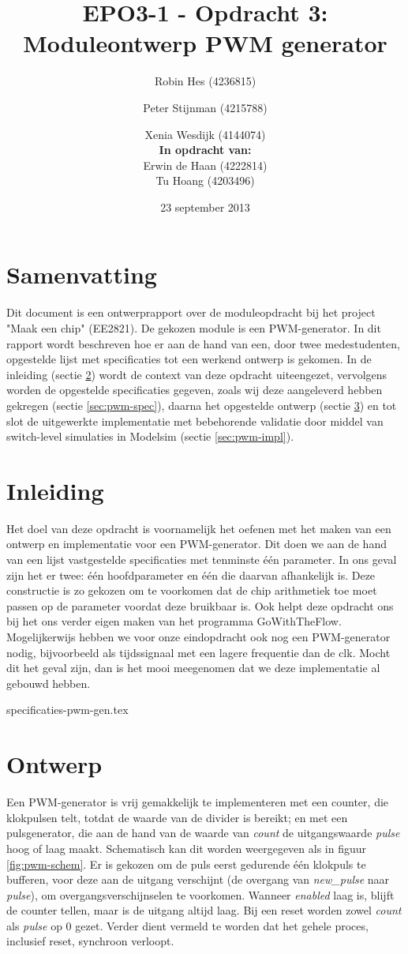 \documentclass{article}
\author{
Robin Hes (4236815) \and Peter Stijnman (4215788) \and Xenia Wesdijk (4144074) \\

\textbf{In opdracht van:} \\
Erwin de Haan (4222814) \\
Tu Hoang (4203496) \\
}
\title{EPO3-1 - Opdracht 3: Moduleontwerp PWM generator}
\date{23 september 2013}
\begin{document}
\maketitle
\section{Samenvatting}
Dit document is een ontwerprapport over de moduleopdracht bij het project "Maak een chip" (EE2821). De gekozen module is een PWM-generator.
In dit rapport wordt beschreven hoe er aan de hand van een, door twee medestudenten, opgestelde lijst met specificaties tot een werkend ontwerp is gekomen.
In de inleiding (sectie \ref{sec:pwm-inl}) wordt de context van deze opdracht uiteengezet, vervolgens worden de opgestelde specificaties gegeven, zoals wij deze aangeleverd hebben gekregen (sectie \ref{sec:pwm-spec}), daarna het opgestelde ontwerp (sectie \ref{sec:pwm-ontw}) en tot slot de uitgewerkte implementatie met bebehorende validatie door middel van switch-level simulaties in Modelsim (sectie \ref{sec:pwm-impl}).

\tableofcontents

\section{Inleiding}
\label{sec:pwm-inl}
Het doel van deze opdracht is voornamelijk het oefenen met het maken van een ontwerp en implementatie voor een PWM-generator. Dit doen we aan de hand van een lijst vastgestelde specificaties met tenminste één parameter. In ons geval zijn het er twee: één hoofdparameter en één die daarvan afhankelijk is. Deze constructie is zo gekozen om te voorkomen dat de chip arithmetiek toe moet passen op de parameter voordat deze bruikbaar is. Ook helpt deze opdracht ons bij het ons verder eigen maken van het programma GoWithTheFlow.
Mogelijkerwijs hebben we voor onze eindopdracht ook nog een PWM-generator nodig, bijvoorbeeld als tijdssignaal met een lagere frequentie dan de clk. Mocht dit het geval zijn, dan is het mooi meegenomen dat we deze implementatie al gebouwd hebben.

{specificaties-pwm-gen.tex}

\section{Ontwerp}
\label{sec:pwm-ontw}
Een PWM-generator is vrij gemakkelijk te implementeren met een counter, die klokpulsen telt, totdat de waarde van de divider is bereikt; en met een pulsgenerator, die aan de hand van de waarde van \textit{count} de uitgangswaarde \textit{pulse} hoog of laag maakt.
Schematisch kan dit worden weergegeven als in figuur \ref{fig:pwm-schem}. Er is gekozen om de puls eerst gedurende één klokpuls te bufferen, voor deze aan de uitgang verschijnt (de overgang van \textit{new\_pulse} naar \textit{pulse}), om overgangsverschijnselen te voorkomen. Wanneer \textit{enabled} laag is, blijft de counter tellen, maar is de uitgang altijd laag. Bij een reset worden zowel \textit{count} als \textit{pulse} op 0 gezet. Verder dient vermeld te worden dat het gehele proces, inclusief reset, synchroon verloopt.
\end{document}
